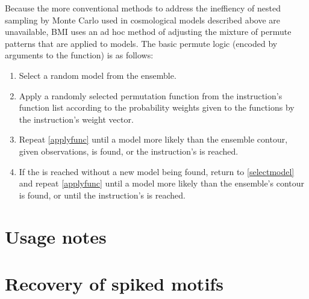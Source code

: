 Because the more conventional methods to address the ineffiency of nested sampling by Monte Carlo used in cosmological models described above are unavailable, BMI uses an ad hoc method of adjusting the mixture of permute patterns that are applied to models. The basic permute logic (encoded by  arguments to the  function) is as follows:

\begin{enumerate}
    \item\label{selectmodel} Select a random  model from the ensemble.
    \item\label{applyfunc} Apply a randomly selected permutation function from the instruction's function list according to the probability weights given to the functions by the instruction's weight vector.
    \item Repeat \ref{applyfunc} until a model more likely than the ensemble contour, given observations, is found, or the instruction's  is reached.
    \item If the  is reached without a new model being found, return to \ref{selectmodel} and repeat \ref{applyfunc} until a model more likely than the ensemble's contour is found, or until the instruction's  is reached.
\end{enumerate}

\section{Usage notes}

\section{Recovery of spiked motifs}